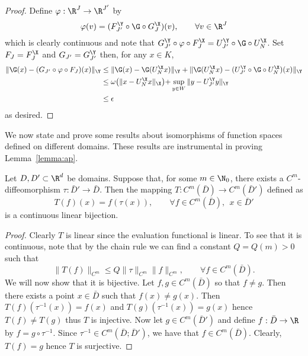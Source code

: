 \begin{proof}
Define \(\varphi : \R^{J} \to \R^{J'}\) by
\[\varphi(v) = (F^{\Y}_{J'} \circ \G \circ G^{\X}_{J} )(v), \qquad \forall v \in \R^{J}\]
which is clearly continuous and note that \(G^{\Y}_{J'} \circ \varphi \circ F^{\X}_J = U^{\Y}_{J'} \circ \G \circ U^{\X}_N\).
Set \(F_J = F^{\X}_J\) and \(G_{J'} = G^{\Y}_{J'}\) then, for any \(x \in K\),
\begin{align*}
\|\G(x) - (G_{J'} \circ \varphi \circ F_J) (x) \|_{\Y} &\leq \|\G(x) - \G(U^{\X}_N x)\|_\Y + \|\G(U^{\X}_N x) - (U^{\Y}_{J'} \circ \G \circ U^{\X}_N) (x) \|_\Y \\
&\leq \omega \bigl (\|x - U^{\X}_N x\|_\X \bigl ) + \sup_{y \in W} \|y - U^{\Y}_{J'} y \|_{\Y} \\
&\leq \epsilon
\end{align*}
as desired.
\end{proof}

We now state and prove some results about isomorphisms of function spaces defined on different domains. These results are instrumental in proving Lemma~\ref{lemma:ap}.

\begin{lemma}
\label{lemma:cm_isomorphism}
Let \(D, D' \subset \R^d\) be domains. Suppose that, for 
some \(m \in \N_0\), there exists a \(C^m\)-diffeomorphism \(\tau : \bar{D}' \to \bar{D}\).
Then the mapping \(T: C^m (\bar{D}) \to C^m (\bar{D}')\) defined as
\[T(f)(x) = f(\tau(x)), \qquad \forall f \in C^m (\bar{D}), \:\: x \in \bar{D}'\]
is a continuous linear bijection.
\end{lemma}

\begin{proof}
Clearly \(T\) is linear since the evaluation functional is linear. To see that it is continuous, 
note that by the chain rule we can find a constant \(Q = Q(m) > 0\) such that
\[\|T(f)\|_{C^m} \leq Q \|\tau\|_{C^m} \|f\|_{C^m}, \qquad \forall f \in C^m(\bar{D}).\]
We will now show that it is bijective. Let \(f,g \in C^m (\bar{D})\) so that \(f \neq g\).
Then there exists a point \(x \in \bar{D}\) such that \(f(x) \neq g(x)\). Then 
\(T(f)(\tau^{-1}(x)) = f(x)\) and \(T(g)(\tau^{-1}(x)) = g(x)\) hence \(T(f) \neq T(g)\) thus
\(T\) is injective.
Now let \(g \in C^m (\bar{D}')\) and define \(f : \bar{D} \to \R\) by \(f = g \circ \tau^{-1}\). 
Since \(\tau^{-1} \in C^m (\bar{D};\bar{D}')\), we have that \(f \in C^m (\bar{D})\). Clearly, 
\(T(f) = g\) hence \(T\) is surjective.
\end{proof}

